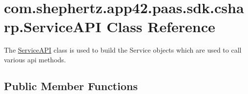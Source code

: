 \hypertarget{classcom_1_1shephertz_1_1app42_1_1paas_1_1sdk_1_1csharp_1_1_service_a_p_i}{\section{com.\+shephertz.\+app42.\+paas.\+sdk.\+csharp.\+Service\+A\+P\+I Class Reference}
\label{classcom_1_1shephertz_1_1app42_1_1paas_1_1sdk_1_1csharp_1_1_service_a_p_i}
}


The \hyperlink{classcom_1_1shephertz_1_1app42_1_1paas_1_1sdk_1_1csharp_1_1_service_a_p_i}{Service\+A\+P\+I} class is used to build the Service objects which are used to call various api methods.  


\subsection*{Public Member Functions}
